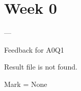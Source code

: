 \documentclass[a4paper,12pt]{CURSUS}
\begin{document}
\addtocounter{chapter}{-1}
\renewcommand{\chaptername}{Assignment}
\chapter{Week 0}

  --- 

 Feedback for A0Q1

 Result file is not found.


 Mark = None
\end{document}
